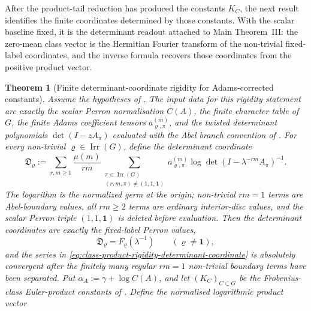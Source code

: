 \documentclass[11pt,a4paper]{amsart}
\theoremstyle{plain}
\newtheorem{theorem}{Theorem}[section]
\theoremstyle{definition}
\theoremstyle{remark}
\DeclareMathOperator{\Irr}{Irr}
\begin{document}
After the product-tail reduction has produced the constants \(K_C\), the next
result identifies the finite coordinates determined by those constants.  With
the scalar baseline fixed, it is the determinant readout attached to Main
Theorem~III: the zero-mean class vector is the Hermitian Fourier transform of
the non-trivial fixed-label coordinates, and the inverse formula recovers those
coordinates from the positive product vector.

\begin{theorem}[Finite determinant-coordinate rigidity for Adams-corrected constants]
  \label{thm:class-product-determinant-rigidity}
  Assume the hypotheses of .  The input
  data for this rigidity statement are exactly the scalar Perron
  normalisation \(C(A)\), the finite character table of \(G\), the finite
  Adams coefficient tensors \(a_{\varrho,\pi}^{(m)}\), and the twisted
  determinant polynomials \(\det(I-zA_\pi)\) evaluated with the Abel branch
  convention of .  For every
  non-trivial \(\varrho\in\Irr(G)\), define the determinant coordinate
  \begin{equation}\label{eq:class-product-rigidity-determinant-coordinate}
    \mathfrak D_\varrho:=
    \sum_{r,m\ge1}\frac{\mu(m)}{rm}
      \sum_{\substack{\pi\in\Irr(G)\\(r,m,\pi)\neq(1,1,\mathbf1)}}
        a_{\varrho,\pi}^{(m)}
        \log\det(I-\lambda^{-rm}A_\pi)^{-1}.
  \end{equation}
  The logarithm is the normalized germ at the origin; non-trivial
  \(rm=1\) terms are Abel-boundary values, all \(rm\ge2\) terms are ordinary
  interior-disc values, and the scalar Perron triple
  \((1,1,\mathbf1)\) is deleted before evaluation.  Then the determinant
  coordinates are exactly the fixed-label Perron values,
  \begin{equation}\label{eq:class-product-rigidity-d-equals-f}
    \mathfrak D_\varrho=F_\varrho(\lambda^{-1})
    \qquad(\varrho\ne\mathbf1),
  \end{equation}
  and the series in
  \eqref{eq:class-product-rigidity-determinant-coordinate} is absolutely
  convergent after the finitely many regular \(rm=1\) non-trivial boundary
  terms have been separated.  Put
  \(\alpha_A:=\gamma+\log C(A)\), and let \((K_C)_{C\subset G}\) be the
  Frobenius-class Euler-product constants of
  .  Define the normalised logarithmic
  product vector
  \begin{equation}\label{eq:class-product-log-vector}

\end{equation}
\end{theorem}
\end{document}
